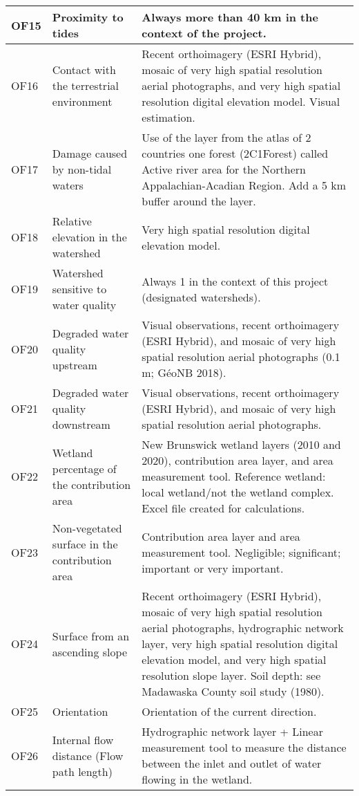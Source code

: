 \begin{longtable}{|l|p{3cm}|p{10cm}|}
    OF15 & Proximity to tides & Always more than 40 km in the context of the project. \\ \hline
    OF16 & Contact with the terrestrial environment & Recent orthoimagery (ESRI Hybrid), mosaic of very high spatial resolution aerial photographs, and very high spatial resolution digital elevation model. Visual estimation. \\ \hline
    OF17 & Damage caused by non-tidal waters & Use of the layer from the atlas of 2 countries one forest (2C1Forest) called Active river area for the Northern Appalachian-Acadian Region. Add a 5 km buffer around the layer. \\ \hline
    OF18 & Relative elevation in the watershed & Very high spatial resolution digital elevation model. \\ \hline
    OF19 & Watershed sensitive to water quality & Always 1 in the context of this project (designated watersheds). \\ \hline
    OF20 & Degraded water quality upstream & Visual observations, recent orthoimagery (ESRI Hybrid), and mosaic of very high spatial resolution aerial photographs (0.1 m; GéoNB 2018). \\ \hline
    OF21 & Degraded water quality downstream & Visual observations, recent orthoimagery (ESRI Hybrid), and mosaic of very high spatial resolution aerial photographs. \\ \hline
    OF22 & Wetland percentage of the contribution area & New Brunswick wetland layers (2010 and 2020), contribution area layer, and area measurement tool. Reference wetland: local wetland/not the wetland complex. Excel file created for calculations. \\ \hline
    OF23 & Non-vegetated surface in the contribution area & Contribution area layer and area measurement tool. Negligible; significant; important or very important. \\ \hline
    OF24 & Surface from an ascending slope & Recent orthoimagery (ESRI Hybrid), mosaic of very high spatial resolution aerial photographs, hydrographic network layer, very high spatial resolution digital elevation model, and very high spatial resolution slope layer. Soil depth: see Madawaska County soil study (1980). \\ \hline
    OF25 & Orientation & Orientation of the current direction. \\ \hline
    OF26 & Internal flow distance (Flow path length) & Hydrographic network layer + Linear measurement tool to measure the distance between the inlet and outlet of water flowing in the wetland. \\ \hline

\end{longtable}

